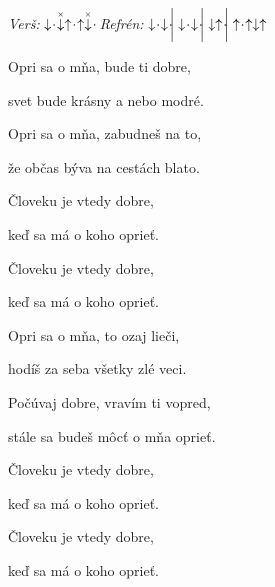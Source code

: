 \begin{song}


 \quad
\textit{Verš:} $\downarrow\hspace{-0.5ex}\cdot\hspace{-0.5ex}\stackrel{\scriptscriptstyle\times}{\downarrow}\uparrow\hspace{-0.5ex}\cdot\hspace{-0.5ex}\uparrow\stackrel{\scriptscriptstyle\times}{\downarrow}\hspace{-0.5ex}\cdot\hspace{-0.5ex}$ \quad
\textit{Refrén:} $\Down\Miss\Down\Miss \Separator \Down\Miss\Down\Miss \Separator \Down\Up\Miss \Separator \Up\Miss\Up\Down\Up$

\large


\Large

\bigskip

 Opri sa o mňa,  bude ti dobre, \par
{} svet bude krásny  a nebo modré. \par

\bigskip

 Opri sa o mňa,  zabudneš na to, \par
{} že občas býva na cestách blato. \par

\bigskip

  \par
Človeku je vtedy dobre,   \par
keď sa má o koho oprieť.  \par
Človeku je vtedy dobre,   \par
keď sa má o koho oprieť.  \par

\bigskip

 Opri sa o mňa,  to ozaj lieči, \par
{} hodíš za seba všetky zlé veci. \par

\bigskip

 Počúvaj dobre,  vravím ti vopred, \par
{} stále sa budeš môcť o mňa oprieť. \par

\bigskip

  \par
Človeku je vtedy dobre,   \par
keď sa má o koho oprieť.  \par
Človeku je vtedy dobre,   \par
keď sa má o koho oprieť.  \par

\end{song}

